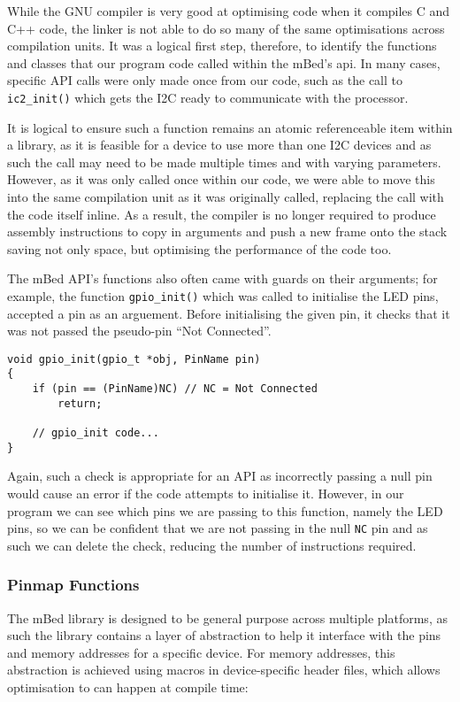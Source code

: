 While the GNU compiler is very good at optimising code when it compiles C and C++ code, the linker is not able to do so many of the same optimisations across compilation units. It was a logical first step, therefore, to identify the functions and classes that our program code called within the mBed's api. In many cases, specific API calls were only made once from our code, such as the call to \verb|ic2_init()| which gets the I2C ready to communicate with the processor.

It is logical to ensure such a function remains an atomic referenceable item within a library, as it is feasible for a device to use more than one I2C devices and as such the call may need to be made multiple times and with varying parameters. However, as it was only called once within our code, we were able to move this into the same compilation unit as it was originally called, replacing the call with the code itself inline. As a result, the compiler is no longer required to produce assembly instructions to copy in arguments and push a new frame onto the stack saving not only space, but optimising the performance of the code too.

The mBed API's functions also often came with guards on their arguments; for example, the function \verb|gpio_init()| which was called to initialise the LED pins, accepted a pin as an arguement. Before initialising the given pin, it checks that it was not passed the pseudo-pin ``Not Connected''.

\begin{lstlisting}[caption={Argument Guards of gpio init}]
void gpio_init(gpio_t *obj, PinName pin)
{
    if (pin == (PinName)NC) // NC = Not Connected
        return;

    // gpio_init code...
}
\end{lstlisting}

Again, such a check is appropriate for an API as incorrectly passing a null pin would cause an error if the code attempts to initialise it. However, in our program we can see which pins we are passing to this function, namely the LED pins, so we can be confident that we are not passing in the null \verb|NC| pin and as such we can delete the check, reducing the number of instructions required.

\subsubsection{Pinmap Functions}

The mBed library is designed to be general purpose across multiple platforms, as such the library contains a layer of abstraction to help it interface with the pins and memory addresses for a specific device. For memory addresses, this abstraction is achieved using macros in device-specific header files, which allows optimisation to can happen at compile time:

